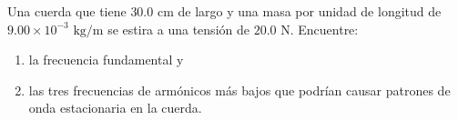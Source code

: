 \item Una cuerda que tiene $30.0\text{ cm}$ de largo y una masa por unidad de longitud de $9.00 \times 10^{-3}\text{ kg/m}$ se estira a una tensión de $20.0\text{ N}$. Encuentre:
\begin{enumerate}
    \item la frecuencia fundamental y
    \item las tres frecuencias de armónicos más bajos que podrían causar patrones de onda estacionaria en la cuerda.
\end{enumerate}
